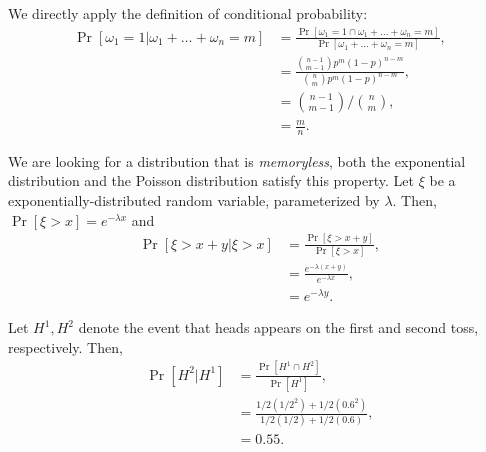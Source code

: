 \begin{problem}{1}
\end{problem}
\begin{solution}
We directly apply the definition of conditional probability:
\begin{align*}
    \Pr[\omega_1 = 1 | \omega_1 + \ldots + \omega_n = m] &= \frac{\Pr[\omega_1 = 1 \cap \omega_1 + \ldots + \omega_n = m]}{\Pr[\omega_1 + \ldots + \omega_n = m]}, \\
    &= \frac{\binom{n-1}{m-1}p^m(1-p)^{n-m}}{\binom{n}{m}p^m(1-p)^{n-m}}, \\
    &= \binom{n-1}{m-1} \big/ \binom{n}{m}, \\
    &= \frac{m}{n}.
\end{align*}
\end{solution}
\begin{problem}{2}
\end{problem}
\begin{solution}
    We are looking for a distribution that is \textit{memoryless}, both the exponential distribution and the Poisson distribution satisfy this property. Let $\xi$ be a exponentially-distributed random variable, parameterized by $\lambda$. Then, 
    $\Pr[\xi > x] = e^{-\lambda x}$ and 
    \begin{align*}
        \Pr[\xi > x+y | \xi > x] &= \frac{\Pr[\xi > x+y]}{\Pr[\xi > x]}, \\
        &= \frac{e^{-\lambda(x+y)}}{e^{-\lambda x}}, \\
        &= e^{-\lambda y}.
    \end{align*}
\end{solution}
\begin{problem}{3}
\end{problem}
\begin{solution}
    Let $H^1, H^2$ denote the event that heads appears on the first and second toss, respectively. Then,
    \begin{align*}
        \Pr[H^2|H^1] &= \frac{\Pr[H^1 \cap H^2]}{\Pr[H^1]}, \\
        &= \frac{1/2(1/2^2) + 1/2(0.6^2)}{1/2(1/2) + 1/2(0.6)}, \\
        &= 0.55.
    \end{align*}
\end{solution}
\begin{problem}{4}
\end{problem}
